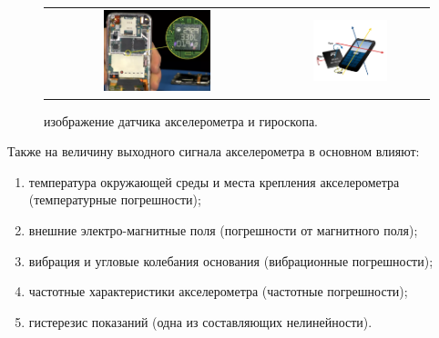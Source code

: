 \begin{figure}[H]
    \begin{center}
        \begin{tabular}{cc}
            \includegraphics[width=0.5\textwidth]{farim/im2} & 
            \includegraphics[width=0.5\textwidth]{farim/im3}
        \end{tabular}
    \end{center}
    \caption{изображение датчика акселерометра и гироскопа.}
\end{figure}
Также на величину выходного сигнала акселерометра в основном влияют:
\begin{enumerate}
    \item температура окружающей среды и места крепления акселерометра (температурные погрешности);
    \item внешние электро-магнитные поля (погрешности от магнитного поля);
    \item вибрация и угловые колебания основания (вибрационные погрешности);
    \item частотные характеристики акселерометра (частотные погрешности);
    \item гистерезис показаний (одна из составляющих нелинейности).
\end{enumerate}



